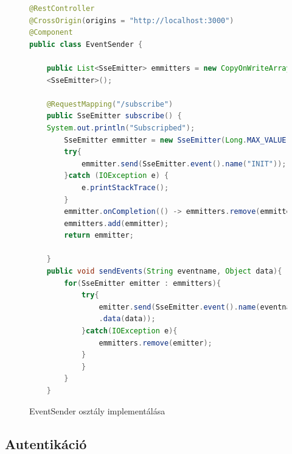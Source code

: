 \documentclass[a4paper,twoside]{article}
\begin{document}
\begin{figure}[ht]
	\caption{EventSender osztály implementálása}
	\begin{minipage}{\textwidth}
	\begin{lstlisting}[language=java]	
@RestController
@CrossOrigin(origins = "http://localhost:3000")
@Component
public class EventSender {
		
	public List<SseEmitter> emmitters = new CopyOnWriteArrayList
	<SseEmitter>();
		
	@RequestMapping("/subscribe")
	public SseEmitter subscribe() {
	System.out.println("Subscripbed");
		SseEmitter emmitter = new SseEmitter(Long.MAX_VALUE);
		try{
			emmitter.send(SseEmitter.event().name("INIT"));
		}catch (IOException e) {
			e.printStackTrace();
		}
		emmitter.onCompletion(() -> emmitters.remove(emmitter));
		emmitters.add(emmitter);
		return emmitter;
		
	}
	public void sendEvents(String eventname, Object data){
		for(SseEmitter emitter : emmitters){
			try{
				emitter.send(SseEmitter.event().name(eventname)
				.data(data));
			}catch(IOException e){
				emmitters.remove(emitter);
			}
			}
		}
	}
	\end{lstlisting}
	\end{minipage}
	\label{eventsender}
\end{figure} 
\FloatBarrier


\subsection{Autentikáció}
\end{document}
